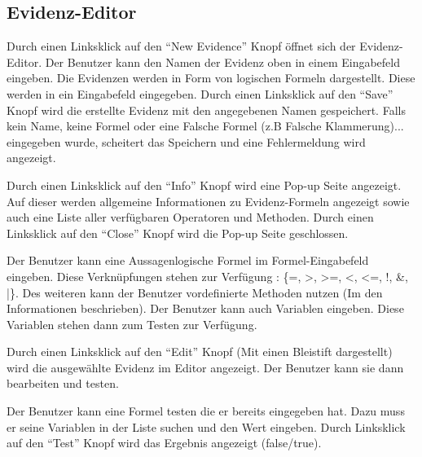 \documentclass[parskip=full,11pt,twoside]{scrartcl}
\begin{document}
\subsection{Evidenz-Editor}


Durch einen Linksklick auf den \enquote{New Evidence} Knopf öffnet sich der Evidenz-Editor. 
Der Benutzer kann den Namen der Evidenz oben in einem Eingabefeld eingeben.
Die Evidenzen werden in Form von logischen Formeln dargestellt. Diese werden in ein Eingabefeld eingegeben.
Durch einen Linksklick auf den \enquote{Save} Knopf wird die erstellte Evidenz mit den angegebenen Namen gespeichert.
Falls kein Name, keine Formel oder eine Falsche Formel (z.B Falsche Klammerung)... eingegeben wurde, scheitert das Speichern und eine Fehlermeldung wird angezeigt.


Durch einen Linksklick auf den \enquote{Info} Knopf wird eine Pop-up Seite angezeigt.
Auf dieser werden allgemeine Informationen zu Evidenz-Formeln angezeigt sowie auch eine Liste aller verfügbaren Operatoren und Methoden.
Durch einen Linksklick auf den \enquote{Close} Knopf wird die Pop-up Seite geschlossen.


Der Benutzer kann eine Aussagenlogische Formel im Formel-Eingabefeld eingeben.
Diese Verknüpfungen stehen zur Verfügung : \{=, >, >=, <, <=, !, \&, |\}.
Des weiteren kann der Benutzer vordefinierte Methoden nutzen (Im den Informationen beschrieben).
Der Benutzer kann auch Variablen eingeben. Diese Variablen stehen dann zum Testen zur Verfügung.


Durch einen Linksklick auf den \enquote{Edit} Knopf (Mit einen Bleistift dargestellt)
wird die ausgewählte Evidenz im Editor angezeigt. Der Benutzer kann sie dann bearbeiten und testen.


Der Benutzer kann eine Formel testen die er bereits eingegeben hat. Dazu muss er seine Variablen in der Liste suchen und den Wert eingeben. Durch Linksklick auf den \enquote{Test} Knopf wird das Ergebnis angezeigt (false/true).

\end{document}
